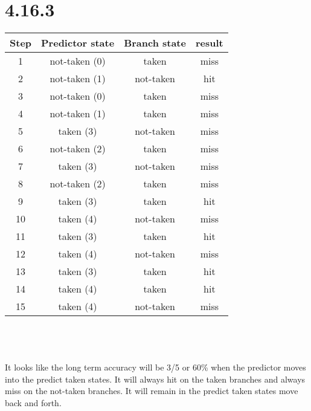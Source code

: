 \documentclass[12pt]{article}
\begin{document}
\section*{4.16.3}
\begin{tabular}{|c|c|c|c|}
	\hline
	Step & Predictor state & Branch state & result\\
	\hline
	1 & not-taken (0) & taken & miss\\
	\hline
	2 & not-taken (1) & not-taken & hit\\
	\hline
	3 & not-taken (0) & taken & miss\\
	\hline
	4 & not-taken (1) & taken & miss\\
	\hline
	5 & taken (3) & not-taken & miss\\
	\hline 
	6 & not-taken (2) & taken & miss\\
	\hline
	7 & taken (3) & not-taken & miss\\
	\hline
	8 & not-taken (2) & taken & miss\\
	\hline
	9 & taken (3) & taken & hit\\
	\hline
	10 & taken (4) & not-taken & miss\\
	\hline
	11 & taken (3) & taken & hit\\
	\hline
	12 & taken (4) & not-taken & miss\\
	\hline
	13 & taken (3) & taken & hit\\
	\hline
	14 & taken (4) & taken & hit\\
	\hline
	15 & taken (4) & not-taken & miss\\
	\hline
\end{tabular}\\
\\
\\
It looks like the long term accuracy will be 3/5 or 60\% when the predictor moves into the predict taken states.  It will always hit on the taken branches and always miss on the not-taken branches.  It will remain in the predict taken states move back and forth.
\end{document}
